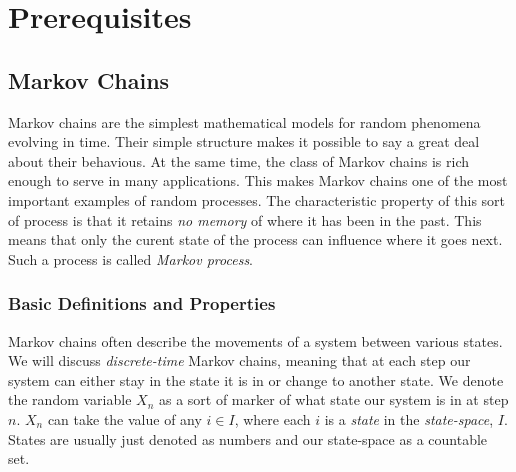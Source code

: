 \chapter{Prerequisites}
\section{Markov Chains}
Markov chains are the simplest mathematical models for random phenomena evolving in time. Their simple structure makes it possible to say a great deal about their behavious. At the same time, the class of Markov chains is rich enough to serve in many applications. This makes Markov chains one of the most important examples of random processes. The characteristic property of this sort of  process is that it retains \emph{no memory} of where it has been in the past. This means that only the curent state of the process can influence where it goes next. Such a process is called \emph{Markov process}.
\subsection{Basic Definitions and Properties}

Markov chains often describe the movements of a system between various states. We will discuss \emph{discrete-time} Markov chains, meaning that at each step our system can either stay in the state it is in or change to another state. We denote the random variable $X_n$ as a sort of marker of what state our system is in at step $n$. $X_n$ can take the value of any $i \in I$, where each $i$ is a \emph{state} in the \emph{state-space}, $I$. States are usually just denoted as numbers and our state-space as a countable set.

